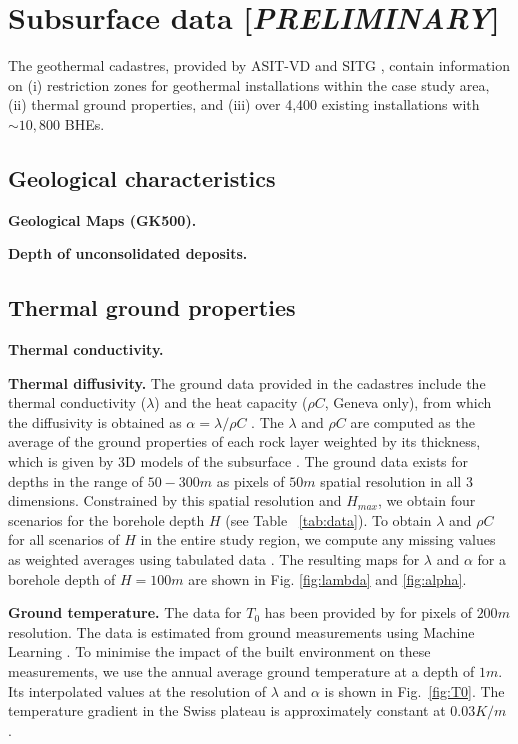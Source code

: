 \section{Subsurface data [\textit{PRELIMINARY}]}
\label{data_geo}

The geothermal cadastres, provided by ASIT-VD \cite{asit_vd_cadastre_2019-1} and SITG \cite{sitg_cadastre_2019}, contain information on (i) restriction zones for geothermal installations within the case study area, (ii) thermal ground properties, and (iii) over 4,400 existing installations with $\sim 10,800$ BHEs.

\subsection{Geological characteristics}
\textbf{Geological Maps (GK500).}

\textbf{Depth of unconsolidated deposits.}

\subsection{Thermal ground properties}

\textbf{Thermal conductivity.}

\textbf{Thermal diffusivity.}
The ground data provided in the cadastres include the thermal conductivity ($\lambda$) and the heat capacity ($\rho C$, Geneva only), from which the diffusivity is obtained as $\alpha = \lambda / \rho C$ \cite{pahud_geothermal_2002}.
The $\lambda$ and $\rho C$ are computed as the average of the ground properties of each rock layer weighted by %
its thickness, which is given by 3D models of the subsurface \cite{groupe_de_travail_pgg_evaluation_2011-1}.
The ground data exists for depths in the range of $50-300m$ as pixels of $50m$ spatial resolution in all 3 dimensions. 
Constrained by this spatial resolution and $H_{max}$, we obtain four scenarios for the borehole depth $H$ (see Table ~\ref{tab:data}).
To obtain $\lambda$ and $\rho C$ for all scenarios of $H$ in the entire study region, we compute any missing values as weighted averages using
tabulated data \cite{groupe_de_travail_pgg_evaluation_2011-1, sia_sondes_2010}. 
The resulting maps for $\lambda$ and $\alpha$ for a borehole depth of $H = 100m$ are shown in Fig. \ref{fig:lambda} and \ref{fig:alpha}.

\textbf{Ground temperature.}
The data for $T_0$ has been provided by \citet{assouline_machine_2019} for pixels of $200m$ resolution.
The data is estimated from ground measurements using Machine Learning \cite{assouline_machine_2019}.
To minimise the impact of the built environment on these measurements, we use the annual average ground temperature at a depth of $1m$.
Its interpolated values at the resolution of $\lambda$ and $\alpha$ is shown in Fig.~\ref{fig:T0}.
The temperature gradient in the Swiss plateau is approximately constant at $0.03K/m$ \cite{sia_sondes_2010}.

